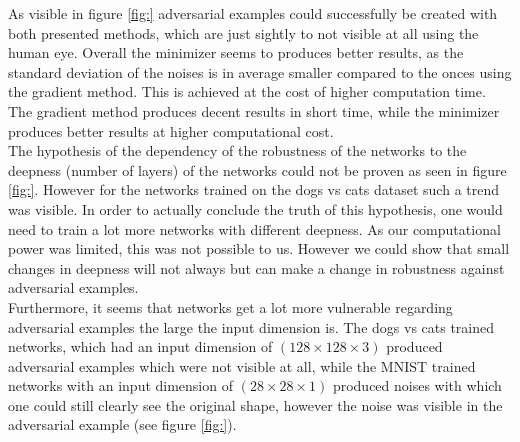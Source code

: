 \documentclass[%
 reprint,
 amsmath,amssymb,
 aps,
]{revtex4-1}
\begin{document}
As visible in figure \ref{fig:} adversarial examples could successfully be created with both presented methods, which are just sightly to not visible at all using the human eye. Overall the minimizer seems to produces better results, as the standard deviation of the noises is in average smaller compared to the onces using the gradient method. This is achieved at the cost of higher computation time. The gradient method produces decent results in short time, while the minimizer produces better results at higher computational cost. \\
The hypothesis of the dependency of the robustness of the networks to the deepness (number of layers) of the networks could not be proven as seen in figure \ref{fig:}. However for the networks trained on the dogs vs cats dataset such a trend was visible. In order to actually conclude the truth of this hypothesis, one would need to train a lot more networks with different deepness. As our computational power was limited, this was not possible to us. However we could show that small changes in deepness will not always but can make a change in robustness against adversarial examples.\\
Furthermore, it seems that networks get a lot more vulnerable regarding adversarial examples the large the input dimension is. The dogs vs cats trained networks, which had an input dimension of $(128 \times 128 \times 3)$ produced adversarial examples which were not visible at all, while the MNIST trained networks with an input dimension of $(28 \times 28 \times 1)$ produced noises with which one could still clearly see the original shape, however the noise was visible in the adversarial example (see figure \ref{fig:}).\\
\end{document}
